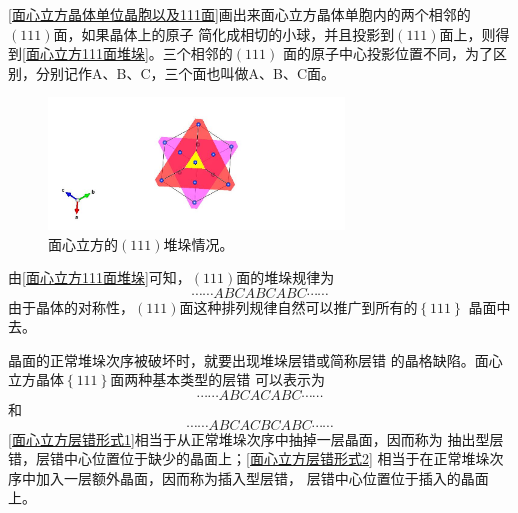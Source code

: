                 \autoref{面心立方晶体单位晶胞以及111面}画出来面心立方晶体单胞内的两个相邻的$(111)$面，如果晶体上的原子
                简化成相切的小球，并且投影到$(111)$面上，则得到\autoref{面心立方111面堆垛}。三个相邻的$(111)$
                面的原子中心投影位置不同，为了区别，分别记作A、B、C，三个面也叫做A、B、C面。
                \begin{figure}[ht]
                    \centering
                    \includegraphics[width=0.7\textwidth]{fig/pile_up_of_planes_of_fcc_crystal.jpg}
                    \caption{面心立方的$(111)$堆垛情况。}
                    \label{面心立方111面堆垛}
                \end{figure}

                由\autoref{面心立方111面堆垛}可知，$(111)$面的堆垛规律为
                \begin{equation}
                    \cdots\cdots ABCABCABC\cdots\cdots 
                \end{equation}
                由于晶体的对称性，$(111)$面这种排列规律自然可以推广到所有的$\left\{ 111\right\}$
                晶面中去。

                晶面的正常堆垛次序被破坏时，就要出现堆垛层错或简称层错
                的晶格缺陷。面心立方晶体$\left\{ 111\right\}$面两种基本类型的层错
                可以表示为
                \begin{equation}
                    \cdots\cdots ABCACABC\cdots\cdots \label{面心立方层错形式1}
                \end{equation}
                和
                \begin{equation}
                    \cdots\cdots ABCACBCABC\cdots\cdots \label{面心立方层错形式2}
                \end{equation}
                \autoref{面心立方层错形式1}相当于从正常堆垛次序中抽掉一层晶面，因而称为
                抽出型层错，层错中心位置位于缺少的晶面上；\autoref{面心立方层错形式2}
                相当于在正常堆垛次序中加入一层额外晶面，因而称为插入型层错，
                层错中心位置位于插入的晶面上。

